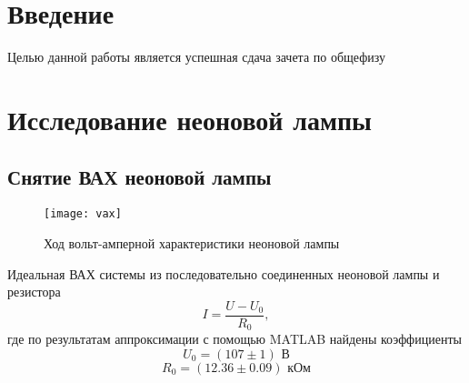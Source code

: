 





\tableofcontents
\newpage

\section*{Введение}
\label{sec:input}

Целью данной работы является успешная сдача зачета по общефизу

\newpage
\section{Исследование неоновой лампы}
\subsection{Снятие ВАХ неоновой лампы}



\newpage

\begin{figure}[H]
	\centering
	\texttt{[image: vax]}
	\caption{Ход вольт-амперной характеристики неоновой лампы}
	\label{fig:figure1}
\end{figure}

Идеальная ВАХ системы из последовательно соединенных неоновой лампы и резистора
\begin{equation}
	I=\frac{U-U_0}{R_0},
\end{equation}
где по результатам аппроксимации с помощью MATLAB найдены коэффициенты 
\begin{equation}
	U_0=(107\pm1) \text{ В}
\end{equation}
\begin{equation}
	R_0=(12.36\pm0.09) \text{ кОм}
\end{equation}



